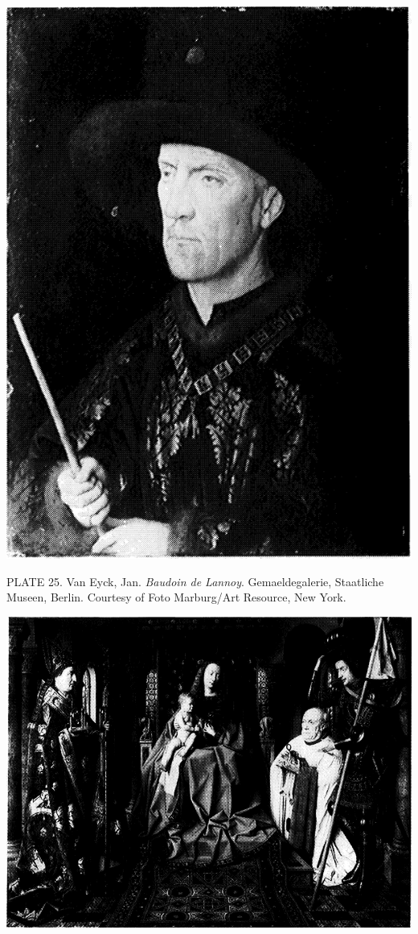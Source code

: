 \protect\hypertarget{20_ILLUSTRATIONS_FOLLOW_PAGE.xhtmlux5cux23id_2299}{}{}\includegraphics{include/html/images/343_2.png}

PLATE 25. Van Eyck, Jan. \emph{Baudoin de Lannoy}. Gemaeldegalerie,
Staatliche Museen, Berlin. Courtesy of Foto Marburg/Art Resource, New
York.

\protect\hypertarget{20_ILLUSTRATIONS_FOLLOW_PAGE.xhtmlux5cux23id_24}{}{}\includegraphics{include/html/images/344_1.png}

